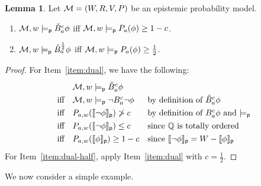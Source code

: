 \documentclass[12pt]{article}
\theoremstyle{definition}
\newtheorem{lemma}[theorem]{Lemma}
\newcommand{\Rat}{\mathbb{Q}}  %
\newcommand{\M}{{\cal M}}      %
\newcommand{\modelsp}{\models_{\mathsf{p}}}                  %
\newcommand{\semp}[1]{\llbracket{#1}\rrbracket_{\mathsf{p}}} %
\begin{document}
\begin{lemma}
  \label{lemma:dual}
  Let $\M=(W,R,V,P)$ be an epistemic probability model.
  \begin{enumerate}
  \item \label{item:dual} $\M,w\modelsp\check B_a^c\phi$ iff
    $\M,w\modelsp P_a(\phi)\geq 1-c$.

  \item \label{item:dual-half} $\M,w\modelsp\check B_a^{\frac 12}\phi$ iff
    $\M,w\modelsp P_a(\phi)\geq \frac 12$.

  \end{enumerate}
\end{lemma}
\begin{proof}
  For Item~\ref{item:dual}, we have the following:
  \[
  \renewcommand{\arraystretch}{1.3}
  \begin{array}{lll}
    &
    \M,w\modelsp\check B^c_a\phi
    \\
    \text{iff} &
    \M,w\modelsp\lnot B^c_a\lnot\phi 
    & \text{by definition of $\check B^c_a\phi$}
    \\
    \text{iff} &
    P_{a,w}(\semp{\lnot\phi})\not>c
    & \text{by definition of $B^c_a\phi$ and $\modelsp$}
    \\
    \text{iff} &
    P_{a,w}(\semp{\lnot\phi})\leq c
    & \text{since $\Rat$ is totally ordered}
    \\
    \text{iff} &
    P_{a,w}(\semp{\phi})\geq 1-c
    & \text{since $\semp{\lnot\phi}=W-\semp{\phi}$}
  \end{array}
  \]
  For Item~\ref{item:dual-half}, apply Item~\ref{item:dual} 
  with $c =\frac 12$. 
\end{proof}


We now consider a simple example.
\end{document}
